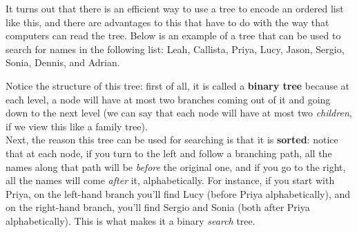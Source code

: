 It turns out that there is an efficient way to use a tree to encode an ordered list like this, and there are advantages to this that have to do with the way that computers can read the tree.  Below is an example of a tree that can be used to search for names in the following list: Leah, Callista, Priya, Lucy, Jason, Sergio, Sonia, Dennis, and Adrian.

\begin{center}
\end{center}

Notice the structure of this tree: first of all, it is called a \textbf{binary tree} because at each level, a node will have at most two branches coming out of it and going down to the next level (we can say that each node will have at most two \emph{children}, if we view this like a family tree).\\

Next, the reason this tree can be used for searching is that it is \textbf{sorted}: notice that at each node, if you turn to the left and follow a branching path, all the names along that path will be \emph{before} the original one, and if you go to the right, all the names will come \emph{after} it, alphabetically.  For instance, if you start with Priya, on the left-hand branch you'll find Lucy (before Priya alphabetically), and on the right-hand branch, you'll find Sergio and Sonia (both after Priya alphabetically).  This is what makes it a binary \emph{search} tree.\\


